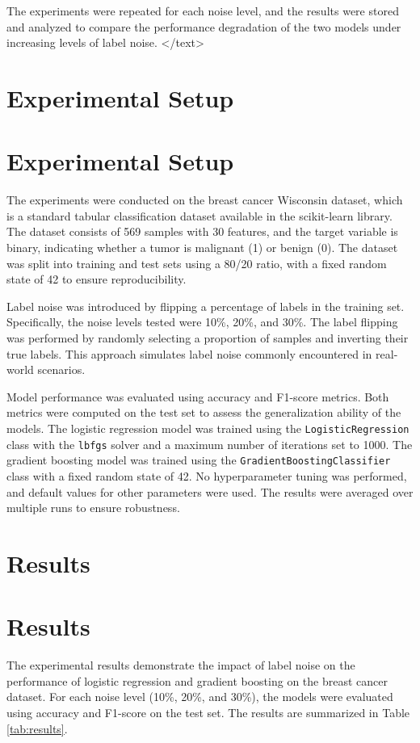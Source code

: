 \documentclass{article}
\begin{document}
The experiments were repeated for each noise level, and the results were stored and analyzed to compare the performance degradation of the two models under increasing levels of label noise.
</text>
\section{Experimental Setup}
\section{Experimental Setup}

The experiments were conducted on the breast cancer Wisconsin dataset, which is a standard tabular classification dataset available in the scikit-learn library. The dataset consists of 569 samples with 30 features, and the target variable is binary, indicating whether a tumor is malignant (1) or benign (0). The dataset was split into training and test sets using a 80/20 ratio, with a fixed random state of 42 to ensure reproducibility.

Label noise was introduced by flipping a percentage of labels in the training set. Specifically, the noise levels tested were 10\%, 20\%, and 30\%. The label flipping was performed by randomly selecting a proportion of samples and inverting their true labels. This approach simulates label noise commonly encountered in real-world scenarios.

Model performance was evaluated using accuracy and F1-score metrics. Both metrics were computed on the test set to assess the generalization ability of the models. The logistic regression model was trained using the \texttt{LogisticRegression} class with the \texttt{lbfgs} solver and a maximum number of iterations set to 1000. The gradient boosting model was trained using the \texttt{GradientBoostingClassifier} class with a fixed random state of 42. No hyperparameter tuning was performed, and default values for other parameters were used. The results were averaged over multiple runs to ensure robustness.
\section{Results}
\section{Results}

The experimental results demonstrate the impact of label noise on the performance of logistic regression and gradient boosting on the breast cancer dataset. For each noise level (10\%, 20\%, and 30\%), the models were evaluated using accuracy and F1-score on the test set. The results are summarized in Table \ref{tab:results}.
\end{document}
